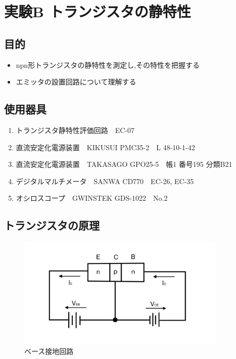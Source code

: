 \documentclass[titlepage]{jarticle}
\begin{document}
\newpage
\section{実験B トランジスタの静特性}
\subsection{目的}
\begin{itemize}
    \item npn形トランジスタの静特性を測定し,その特性を把握する
    \item エミッタの設置回路について理解する
\end{itemize}
\subsection{使用器具}
\begin{enumerate}
    \item トランジスタ静特性評価回路　EC-07
    \item 直流安定化電源装置　KIKUSUI PMC35-2　L 48-10-1-42
    \item 直流安定化電源装置　TAKASAGO GPO25-5　帳1 番号195 分類B21
    \item デジタルマルチメータ　SANWA CD770　EC-26, EC-35
    \item オシロスコープ　GWINSTEK GDS-1022　No.2
\end{enumerate}

\subsection{トランジスタの原理}
\begin{figure}[H]
    \begin{center}
        \includegraphics[width=10cm]{image/tr.jpg}
        \caption{ベース接地回路}
        \label{fig:ベース接地回路}
    \end{center}
\end{figure}
\end{document}
